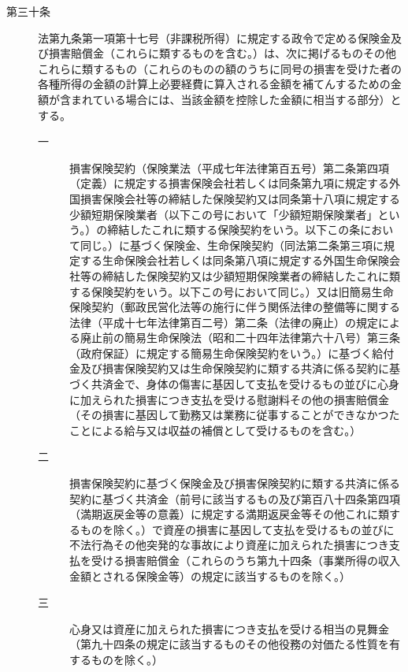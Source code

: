 \documentclass[twocolumn,a4j,10pt]{ltjtarticle}
\begin{document}
\begin{description}
\item[第三十条]法第九条第一項第十七号（非課税所得）に規定する政令で定める保険金及び損害賠償金（これらに類するものを含む。）は、次に掲げるものその他これらに類するもの（これらのものの額のうちに同号の損害を受けた者の各種所得の金額の計算上必要経費に算入される金額を補てんするための金額が含まれている場合には、当該金額を控除した金額に相当する部分）とする。
\begin{description}
\item[一]損害保険契約（保険業法（平成七年法律第百五号）第二条第四項（定義）に規定する損害保険会社若しくは同条第九項に規定する外国損害保険会社等の締結した保険契約又は同条第十八項に規定する少額短期保険業者（以下この号において「少額短期保険業者」という。）の締結したこれに類する保険契約をいう。以下この条において同じ。）に基づく保険金、生命保険契約（同法第二条第三項に規定する生命保険会社若しくは同条第八項に規定する外国生命保険会社等の締結した保険契約又は少額短期保険業者の締結したこれに類する保険契約をいう。以下この号において同じ。）又は旧簡易生命保険契約（郵政民営化法等の施行に伴う関係法律の整備等に関する法律（平成十七年法律第百二号）第二条（法律の廃止）の規定による廃止前の簡易生命保険法（昭和二十四年法律第六十八号）第三条（政府保証）に規定する簡易生命保険契約をいう。）に基づく給付金及び損害保険契約又は生命保険契約に類する共済に係る契約に基づく共済金で、身体の傷害に基因して支払を受けるもの並びに心身に加えられた損害につき支払を受ける慰謝料その他の損害賠償金（その損害に基因して勤務又は業務に従事することができなかつたことによる給与又は収益の補償として受けるものを含む。）
\item[二]損害保険契約に基づく保険金及び損害保険契約に類する共済に係る契約に基づく共済金（前号に該当するもの及び第百八十四条第四項（満期返戻金等の意義）に規定する満期返戻金等その他これに類するものを除く。）で資産の損害に基因して支払を受けるもの並びに不法行為その他突発的な事故により資産に加えられた損害につき支払を受ける損害賠償金（これらのうち第九十四条（事業所得の収入金額とされる保険金等）の規定に該当するものを除く。）
\item[三]心身又は資産に加えられた損害につき支払を受ける相当の見舞金（第九十四条の規定に該当するものその他役務の対価たる性質を有するものを除く。）
\end{description}
\end{description}
\end{document}
